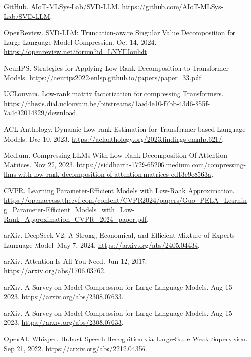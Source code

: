 \documentclass{article}
\begin{document}
\begin{thebibliography}{21}
GitHub. AIoT-MLSys-Lab/SVD-LLM. \url{https://github.com/AIoT-MLSys-Lab/SVD-LLM}.

OpenReview. SVD-LLM: Truncation-aware Singular Value Decomposition for Large Language Model Compression. Oct 14, 2024. \url{https://openreview.net/forum?id=LNYIUouhdt}.

NeurIPS. Strategies for Applying Low Rank Decomposition to Transformer Models. \url{https://neurips2022-enlsp.github.io/papers/paper_33.pdf}.

UCLouvain. Low-rank matrix factorization for compressing Transformers. \url{https://thesis.dial.uclouvain.be/bitstreams/1aed4e10-f7bb-43d6-855f-7a4c92014829/download}.

ACL Anthology. Dynamic Low-rank Estimation for Transformer-based Language Models. Dec 10, 2023. \url{https://aclanthology.org/2023.findings-emnlp.621/}.

Medium. Compressing LLMs With Low Rank Decomposition Of Attention Matrices. Nov 22, 2023. \url{https://siddharth-1729-65206.medium.com/compressing-llms-with-low-rank-decomposition-of-attention-matrices-ed13e9e8563a}.

CVPR. Learning Parameter-Efficient Models with Low-Rank Approximation. \url{https://openaccess.thecvf.com/content/CVPR2024/papers/Guo_PELA_Learning_Parameter-Efficient_Models_with_Low-Rank_Approximation_CVPR_2024_paper.pdf}.

arXiv. DeepSeek-V2: A Strong, Economical, and Efficient Mixture-of-Experts Language Model. May 7, 2024. \url{https://arxiv.org/abs/2405.04434}.

arXiv. Attention Is All You Need. Jun 12, 2017. \url{https://arxiv.org/abs/1706.03762}.

arXiv. A Survey on Model Compression for Large Language Models. Aug 15, 2023. \url{https://arxiv.org/abs/2308.07633}.

arXiv. A Survey on Model Compression for Large Language Models. Aug 15, 2023. \url{https://arxiv.org/abs/2308.07633}.

OpenAI. Whisper: Robust Speech Recognition via Large-Scale Weak Supervision. Sep 21, 2022. \url{https://arxiv.org/abs/2212.04356}.

\end{thebibliography}
\end{document}
